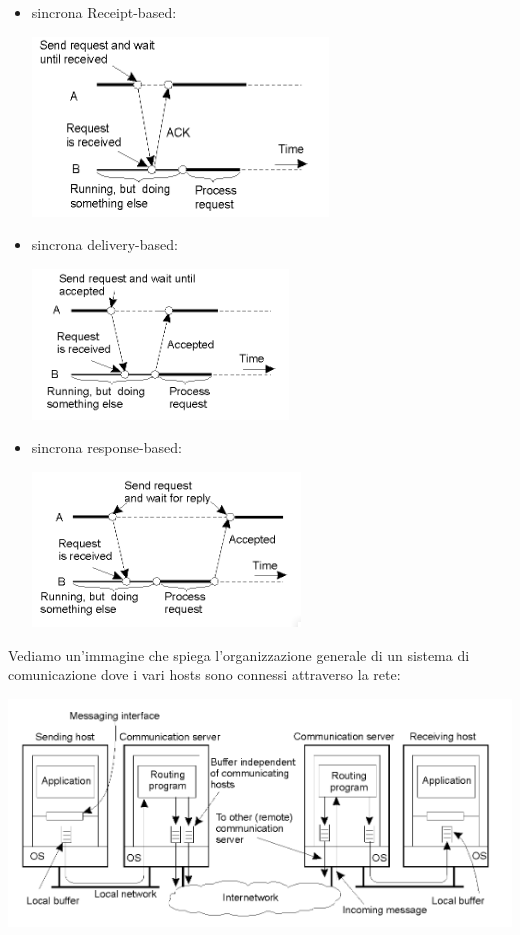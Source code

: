 \documentclass[a4paper,12pt, oneside]{book}
\begin{document}
\begin{itemize}
\begin{itemize}
\begin{center}
        \end{center}
		\item sincrona Receipt-based:
		\begin{center}
			\includegraphics[scale=0.8]{img/sin2.png}
        \end{center}
        \item sincrona delivery-based:
        \begin{center}
			\includegraphics[scale=0.8]{img/sin3.png}
        \end{center}
        \item sincrona response-based:
        \begin{center}
			\includegraphics[scale=0.8]{img/sin4.png}
        \end{center}
	\end{itemize}
\end{itemize}
Vediamo un'immagine che spiega l'organizzazione generale di un sistema di comunicazione dove i vari hosts sono connessi attraverso la rete:
\begin{center}
\includegraphics[scale=0.8]{img/host.png}
\end{center}
\end{document}
